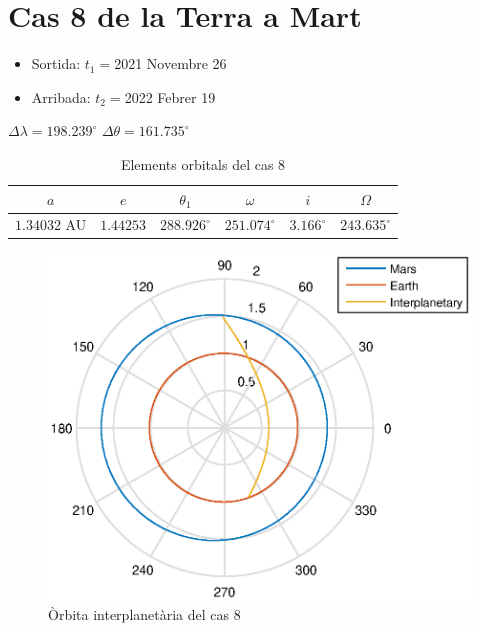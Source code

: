 \section{Cas 8 de la Terra a Mart}
\begin{itemize}
	\item Sortida: $t_{1}=$2021 Novembre 26
	\item Arribada: $t_{2}=$2022 Febrer 19
\end{itemize}
$\Delta\lambda=198.239^{\circ}$
$\Delta\theta=161.735^{\circ}$
\begin{table}[h!]
	\centering
	\begin{tabular}{ |c|c|c|c|c|c|}
		\hline
		$a$ & $e$ & $\theta_{1}$ & $\omega$ & $i$ & $\Omega$ \\ \hline
		$1.34032$ AU  & $1.44253$ & $288.926^{\circ}$ & $251.074^{\circ}$ & $3.166^{\circ}$ & $243.635^{\circ}$ \\ \hline
	\end{tabular}
	\caption{Elements orbitals del cas 8}
\end{table}
\begin{figure}[H]
	\centering
	\includegraphics[scale=0.95]{./plots/cas8}
	\caption{Òrbita interplanetària del cas 8}
\end{figure}

